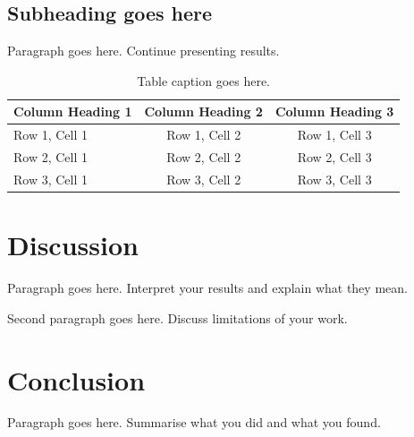 \documentclass[11pt]{article}
\begin{document}
\subsection{Subheading goes here}

Paragraph goes here. Continue presenting results.

%

\begin{table}[h]
  \centering
  \begin{tabular}{lcc}
    \hline
    \textbf{Column Heading 1} & \textbf{Column Heading 2} & \textbf{Column Heading 3} \\
    \hline
    Row 1, Cell 1  & Row 1, Cell 2  & Row 1, Cell 3  \\
    Row 2, Cell 1  & Row 2, Cell 2  & Row 2, Cell 3  \\
    Row 3, Cell 1  & Row 3, Cell 2  & Row 3, Cell 3  \\
    \hline
  \end{tabular}
  \caption{Table caption goes here.}
  \label{tab:my-table}
\end{table}



\section{Discussion}

Paragraph goes here. Interpret your results and explain what they mean.

Second paragraph goes here. Discuss limitations of your work.


\section{Conclusion}

Paragraph goes here. Summarise what you did and what you found.
\end{document}
